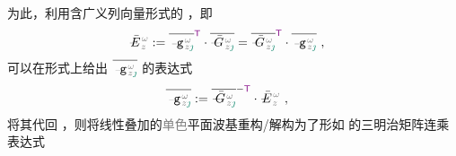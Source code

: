 为此，利用含广义列向量形式的 ，即
\begin{align} \label{eq:vec-amp_eigenmode-matrix}
	\Xint{\mathcolor{gray}{-}}{30}{\bar{E}}^{\;\!\mathcolor{gray}{\omega}}_{\;\! \mathcolor{gray}{z}} &:= \overline{\Xint{\begin{smallmatrix} ~ \\ {}^{}_{\mathcolor{gray}{-}} \\ ~ \end{smallmatrix}}{09}{\mathtt{g}}^{\;\!\mathcolor{gray}{\omega}}_{\;\! \mathcolor{gray}{z} \textcolor{PineGreen}{\jmath}}}^{\mathsf{\textcolor{Plum}{T}}} \cdot \overline{\Xint{\mathcolor{gray}{-}}{20}{\bar{G}}^{\;\!\mathcolor{gray}{\omega}}_{\;\! \mathcolor{gray}{z} \textcolor{PineGreen}{\jmath}}} = \overline{\Xint{\mathcolor{gray}{-}}{20}{\bar{G}}^{\;\!\mathcolor{gray}{\omega}}_{\;\! \mathcolor{gray}{z} \textcolor{PineGreen}{\jmath}}}^{\mathsf{\textcolor{Plum}{T}}} \cdot \overline{\Xint{\begin{smallmatrix} ~ \\ {}^{}_{\mathcolor{gray}{-}} \\ ~ \end{smallmatrix}}{09}{\mathtt{g}}^{\;\!\mathcolor{gray}{\omega}}_{\;\! \mathcolor{gray}{z} \textcolor{PineGreen}{\jmath}}} ~,
\end{align}
可以在形式上给出 $\overline{\Xint{\begin{smallmatrix} ~ \\ {}^{}_{\mathcolor{gray}{-}} \\ ~ \end{smallmatrix}}{09}{\mathtt{g}}^{\;\!\mathcolor{gray}{\omega}}_{\;\! \mathcolor{gray}{z} \textcolor{PineGreen}{\jmath}}}$ 的表达式
\begin{align} \label{eq:amp_vec}
	\overline{\Xint{\begin{smallmatrix} ~ \\ {}^{}_{\mathcolor{gray}{-}} \\ ~ \end{smallmatrix}}{09}{\mathtt{g}}^{\;\!\mathcolor{gray}{\omega}}_{\;\! \mathcolor{gray}{z} \textcolor{PineGreen}{\jmath}}} &:= \overline{\Xint{\mathcolor{gray}{-}}{20}{\bar{G}}^{\;\!\mathcolor{gray}{\omega}}_{\;\! \mathcolor{gray}{z} \textcolor{PineGreen}{\jmath}}}^{-\mathsf{\textcolor{Plum}{T}}} \cdot \Xint{\mathcolor{gray}{-}}{30}{\bar{E}}^{\;\!\mathcolor{gray}{\omega}}_{\;\! \mathcolor{gray}{z}} ~,
\end{align}
将其代回 ，则将\textcolor{PineGreen}{线性叠加的\textcolor{gray}{单色}平面波基}重构/解构为了形如  的三明治矩阵连乘表达式
